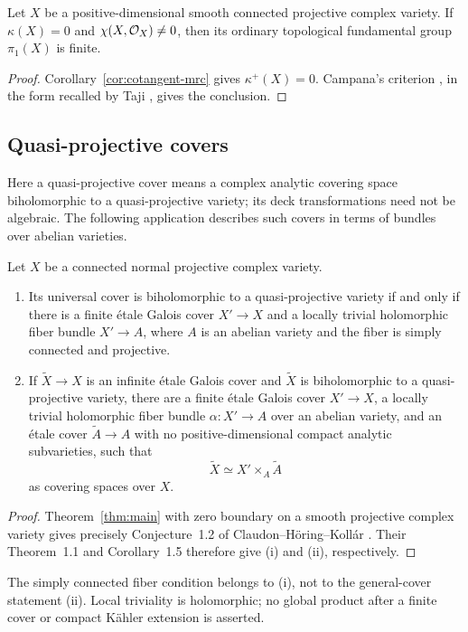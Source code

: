 \begin{corollary}
\label{cor:finite-pi-one}
Let \(X\) be a positive-dimensional smooth connected projective complex
variety. If \(\kappa(X)=0\) and \(\chi(X,\mathcal{O}_X)\ne0\), then its ordinary
topological fundamental group \(\pi_1(X)\) is finite.
\end{corollary}
\begin{proof}
Corollary~\ref{cor:cotangent-mrc} gives \(\kappa^+(X)=0\).
Campana's criterion \cite[Corollary~5.3]{Campana1995}, in the form
recalled by Taji \cite[Theorem~1.6]{Taji2014}, gives the conclusion.
\end{proof}

\subsection{Quasi-projective covers}

Here a quasi-projective cover means a complex analytic covering space
biholomorphic to a quasi-projective variety; its deck transformations
need not be algebraic. The following application describes such covers
in terms of bundles over abelian varieties.

\begin{corollary}
\label{cor:quasi-projective-covers}
Let \(X\) be a connected normal projective complex variety.
\begin{enumerate}[label=\textup{(\roman*)}]
\item Its universal cover is biholomorphic to a quasi-projective variety
if and only if there is a finite \'etale Galois cover \(X'\to X\)
and a locally trivial holomorphic fiber bundle \(X'\to A\), where
\(A\) is an abelian variety and the fiber is simply connected and projective.
\item If \(\widetilde X\to X\) is an infinite \'etale Galois cover
and \(\widetilde X\) is biholomorphic to a quasi-projective variety,
there are a finite \'etale Galois cover \(X'\to X\), a locally trivial
holomorphic fiber bundle \(\alpha:X'\to A\) over an abelian variety,
and an \'etale cover \(\widetilde A\to A\) with no positive-dimensional
compact analytic subvarieties, such that
\[
 \widetilde X\simeq X'\times_A\widetilde A
\]
as covering spaces over \(X\).
\end{enumerate}
\end{corollary}
\begin{proof}
Theorem~\ref{thm:main} with zero boundary on a smooth projective complex
variety gives precisely Conjecture~1.2 of
Claudon--H\"oring--Koll\'ar \cite{ClaudonHoeringKollar2013}.
Their Theorem~1.1 and Corollary~1.5 therefore give \textup{(i)} and
\textup{(ii)}, respectively.
\end{proof}

The simply connected fiber condition belongs to \textup{(i)}, not to
the general-cover statement \textup{(ii)}. Local triviality is holomorphic;
no global product after a finite cover or compact K\"ahler extension is
asserted.
